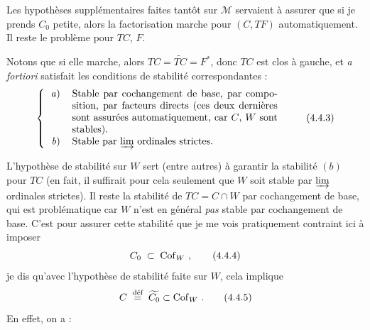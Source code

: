 Les hypothèses supplémentaires faites tantôt sur $\mathcal{M}$ servaient à assurer que si je prends $C_0$ petite, alors la factorisation marche pour $(C,TF)$ automatiquement. Il reste le problème pour $TC$, $F$.

Notons que si elle marche, alors $TC=\widetilde{TC}=F^*$, donc $TC$ est clos à gauche, et \textit{a fortiori} satisfait les conditions de stabilité correspondantes :
\[
\left\{
\begin{tabular}{rp{0.6\textwidth}}
\textit{a}) & Stable par cochangement de base, par composition, par facteurs directs (ces deux dernières sont assurées automatiquement, car $C$, $W$ sont stables).\\[1ex]
\textit{b}) & Stable par $\varinjlim$ ordinales strictes.
\end{tabular}
\right.
\tag*{(4.4.3)}
\]

L'hypothèse de stabilité sur $W$ sert (entre autres) à garantir la stabilité $(b)$ pour $TC$ (en fait, il suffirait pour cela seulement que $W$ soit stable par $\varinjlim$ ordinales strictes). Il reste la stabilité de $TC=C{\cap}W$ par cochangement de base, qui est problématique car $W$ n'est en général \textit{pas} stable par cochangement de base. C'est pour assurer cette stabilité que je me vois pratiquement contraint ici à imposer
\[
C_0\;\subset\;\Cof_W\ , \tag*{(4.4.4)}
\]
je dis qu'avec l'hypothèse de stabilité faite sur $W$, cela implique
\[
C\;\deq\;\widetilde{C_0}\subset\Cof_W\ . \tag*{(4.4.5)}
\]
En effet, on a :

